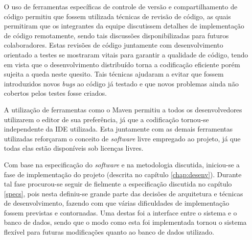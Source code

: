 O uso de ferramentas específicas de controle de versão e compartilhamento de código permitiu que fossem utilizada técnicas de revisão de código, as quais permitiram que os integrantes da equipe discutissem detalhes de implementação de código remotamente, sendo tais discussões disponibilizadas para futuros colaboradores. 
Estas revisões de código juntamente com desenvolvimento orientado a testes se mostraram vitais para garantir a qualidade de código, tendo em vista que o desenvolvimento distribuído torna a codificação eficiente porém sujeita a queda neste quesito.
Tais técnicas ajudaram a evitar que fossem introduzidos novos \emph{bugs} ao código já testado e que novos problemas ainda não cobertos pelos testes fosse criados.

A utilização de ferramentas como o Maven permitiu a todos os desenvolvedores utilizarem o editor de sua preferência, já que a codificação tornou-se independente da IDE utilizada.
Esta juntamente com as demais ferramentas utilizadas reforçaram o conceito de \emph{software} livre empregado ao projeto, já que todas elas estão disponíveis sob licenças livres. 

Com base na especificação do \emph{software} e na metodologia discutida, iniciou-se a fase de implementação do projeto (descrita no capítulo \ref{chap:desenv}). 
Durante tal fase procurou-se seguir de fielmente a especificação discutida no capítulo \ref{specs}, pois nesta definiu-se grande parte das decisões de arquitetura e técnicas de desenvolvimento, fazendo com que várias dificuldades de implementação fossem previstas e contornadas.
Uma destas foi a interface entre o sistema e o banco de dados, sendo que o modo como esta foi implementada tornou o sistema flexível para futuras modificações quanto ao banco de dados utilizado.

